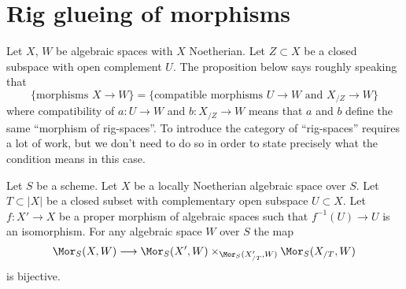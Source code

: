 \section{Rig glueing of morphisms}
\label{section-glue-formal-to-actual}

\noindent
Let $X$, $W$ be algebraic spaces with $X$ Noetherian. Let $Z \subset X$
be a closed subspace with open complement $U$.
The proposition below says roughly speaking that
$$
\{\text{morphisms }X \to W\} =
\{\text{compatible morphisms }U \to W\text{ and }X_{/Z} \to W\}
$$
where compatibility of $a : U \to W$ and $b : X_{/Z} \to W$
means that $a$ and $b$ define the same ``morphism of rig-spaces''.
To introduce the category of ``rig-spaces'' requires a lot of work, but
we don't need to do so in order to state precisely what the
condition means in this case.

\begin{proposition}
\label{proposition-glue-modification}
Let $S$ be a scheme. Let $X$ be a locally Noetherian algebraic space over $S$.
Let $T \subset |X|$ be a closed subset with complementary open subspace
$U \subset X$. Let $f : X' \to X$ be a proper morphism
of algebraic spaces such that $f^{-1}(U) \to U$ is an isomorphism.
For any algebraic space $W$ over $S$ the map
$$
\Mor_S(X, W) \longrightarrow
\Mor_S(X', W) \times_{\Mor_S(X'_{/T}, W)} \Mor_S(X_{/T}, W)
$$
is bijective.
\end{proposition}


